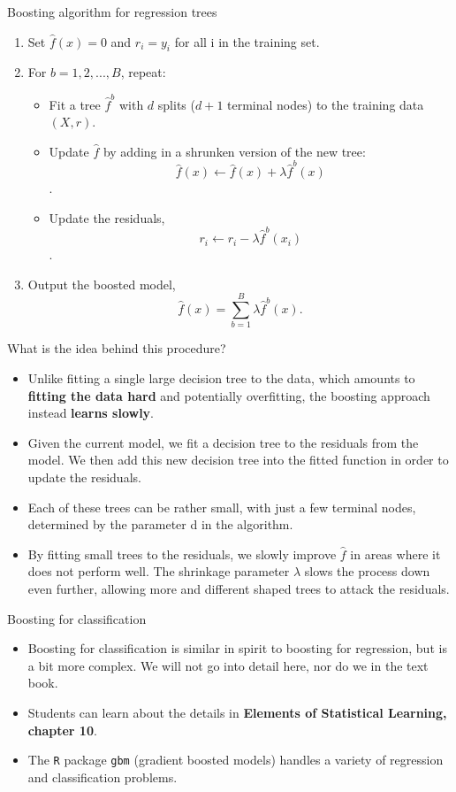 \documentclass[aspectratio=169, 11pt]{beamer}
\begin{document}
\begin{frame}{Boosting algorithm for regression trees}
\begin{enumerate}
    \item Set $\hat{f}(x)=0$ and $r_{i}=y_{i}$ for all i in the training set.
    \item For $b=1,2,...,B$, repeat:
    \begin{itemize}
        \item[2.1] Fit a tree $\hat{f}^{b}$ with $d$ splits ($d+1$ terminal nodes) to the training data $(X, r)$.
        \item[2.2] Update $\hat{f}$ by adding in a shrunken version of the new tree: $$\hat{f}(x)\leftarrow\hat{f}(x)+\lambda\hat{f}^{b}(x)$$.
        \item[2.3] Update the residuals, $$r_{i}\leftarrow r_{i}-\lambda\hat{f}^{b}(x_{i})$$.
    \end{itemize}
    \item Output the boosted model,
    \begin{equation*}
    \hat{f}(x)=\sum_{b=1}^{B}\lambda\hat{f}^{b}(x).
    \end{equation*}
\end{enumerate}
\end{frame}

\begin{frame}{What is the idea behind this procedure?}
\begin{itemize}
    \item Unlike fitting a single large decision tree to the data, which amounts to \textbf{fitting the data hard} and potentially overfitting, the boosting approach instead \textbf{learns slowly}.
    \item Given the current model, we fit a decision tree to the residuals from the model. We then add this new decision tree into the fitted function in order to update the residuals.
    \item Each of these trees can be rather small, with just a few terminal nodes, determined by the parameter d in the algorithm.
    \item By fitting small trees to the residuals, we slowly improve $\hat{f}$ in areas where it does not perform well. The shrinkage parameter $\lambda$ slows the process down even further, allowing more and different shaped trees to attack the residuals.
\end{itemize}
\end{frame}

\begin{frame}{Boosting for classification}
\begin{itemize}
    \item Boosting for classification is similar in spirit to boosting for regression, but is a bit more complex. We will not go into detail here, nor do we in the text book.
    \item Students can learn about the details in \textbf{Elements of Statistical Learning, chapter 10}.
    \item The \texttt{R} package \texttt{gbm} (gradient boosted models) handles a variety of regression and classification problems.
\end{itemize}
\end{frame}
\end{document}
